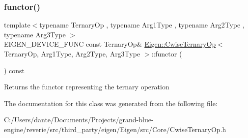 \subsubsection{\texorpdfstring{functor()}{functor()}}
{\footnotesize\ttfamily template$<$typename Ternary\+Op , typename Arg1\+Type , typename Arg2\+Type , typename Arg3\+Type $>$ \\
E\+I\+G\+E\+N\+\_\+\+D\+E\+V\+I\+C\+E\+\_\+\+F\+U\+NC const Ternary\+Op\& \mbox{\hyperlink{class_eigen_1_1_cwise_ternary_op}{Eigen\+::\+Cwise\+Ternary\+Op}}$<$ Ternary\+Op, Arg1\+Type, Arg2\+Type, Arg3\+Type $>$\+::functor (\begin{DoxyParamCaption}{ }\end{DoxyParamCaption}) const\hspace{0.3cm}{\ttfamily [inline]}}

\begin{DoxyReturn}{Returns}
the functor representing the ternary operation 
\end{DoxyReturn}


The documentation for this class was generated from the following file\+:\begin{DoxyCompactItemize}
\item 
C\+:/\+Users/dante/\+Documents/\+Projects/grand-\/blue-\/engine/reverie/src/third\+\_\+party/eigen/\+Eigen/src/\+Core/Cwise\+Ternary\+Op.\+h\end{DoxyCompactItemize}

